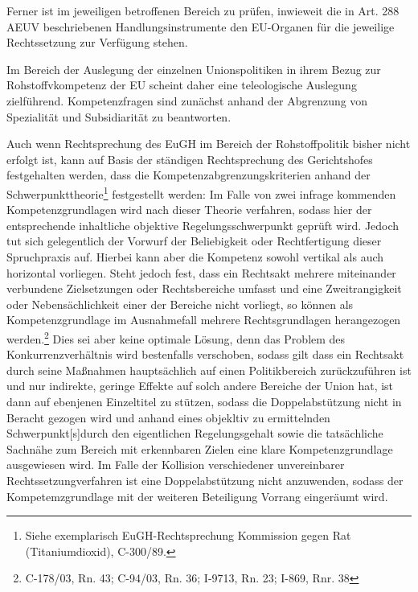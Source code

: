 \documentclass[12pt,a4paper,oneside]{book} %
\begin{document}
	Ferner ist im jeweiligen betroffenen Bereich zu prüfen, inwieweit die in Art. 288 AEUV beschriebenen Handlungsinstrumente den EU-Organen für die jeweilige Rechtssetzung zur Verfügung stehen.  
	
	Im Bereich der Auslegung der einzelnen Unionspolitiken in ihrem Bezug zur Rohstoffvkompetenz der EU scheint daher eine teleologische Auslegung zielführend. Kompetenzfragen sind zunächst anhand der Abgrenzung von Spezialität und Subsidiarität zu beantworten.\autocite{Callies, Berliner Beiträge 137, S. 39f.}
	
	Auch wenn Rechtsprechung des EuGH im Bereich der Rohstoffpolitik bisher nicht erfolgt ist, kann auf Basis der ständigen Rechtsprechung des Gerichtshofes festgehalten werden, dass die Kompetenzabgrenzungskriterien anhand der \glqq Schwerpunkttheorie\grqq\footnote{Siehe exemplarisch EuGH-Rechtsprechung Kommission gegen Rat (Titaniumdioxid), C-300/89.} festgestellt werden: Im Falle von zwei infrage kommenden Kompetenzgrundlagen wird nach dieser Theorie verfahren, sodass hier der entsprechende inhaltliche objektive Regelungsschwerpunkt geprüft wird\autocite[Callies, Art. 175, Rn 22 sowie Kahl, Art. 95, Rn 73ff]{callies_euvaeuv_2022}. Jedoch tut sich gelegentlich der Vorwurf der Beliebigkeit oder Rechtfertigung dieser Spruchpraxis auf.\autocite{Nettesheim, Grabits/Hilf/Nettesheim, AEUV Art 194 Rn. 35} Hierbei kann aber die Kompetenz sowohl vertikal als auch horizontal vorliegen.\autocite[30f.]{callies_stellungnahme_2007} Steht jedoch fest, dass ein Rechtsakt mehrere miteinander verbundene Zielsetzungen oder Rechtsbereiche umfasst und eine Zweitrangigkeit oder Nebensächlichkeit einer der Bereiche nicht vorliegt, so können als Kompetenzgrundlage im Ausnahmefall mehrere Rechtsgrundlagen herangezogen werden.\footnote{C-178/03, Rn. 43; C-94/03, Rn. 36; I-9713, Rn. 23;  I-869, Rnr. 38} Dies sei aber keine optimale Lösung, denn das Problem des Konkurrenzverhältnis wird bestenfalls verschoben, sodass gilt dass ein Rechtsakt durch seine Maßnahmen hauptsächlich auf einen Politikbereich zurückzuführen ist und nur indirekte, geringe Effekte auf solch andere Bereiche der Union hat, ist dann auf ebenjenen Einzeltitel zu stützen, sodass die Doppelabstützung nicht in Beracht gezogen wird und anhand eines \glqq objekltiv zu ermittelnden Schwerpunkt[s]\grqq durch den eigentlichen Regelungsgehalt sowie die tatsächliche Sachnähe zum Bereich mit erkennbaren Zielen eine klare Kompetenzgrundlage ausgewiesen wird.\autocite{Callies, Berliner Beiträge 137, S. 40} Im Falle der Kollision verschiedener unvereinbarer  Rechtssetzungverfahren ist eine Doppelabstützung nicht anzuwenden, sodass der Kompetemzgrundlage mit der weiteren Beteiligung Vorrang eingeräumt wird.\autocite{Callies, Berliner Beiträge 137, S. 40}
\end{document}
